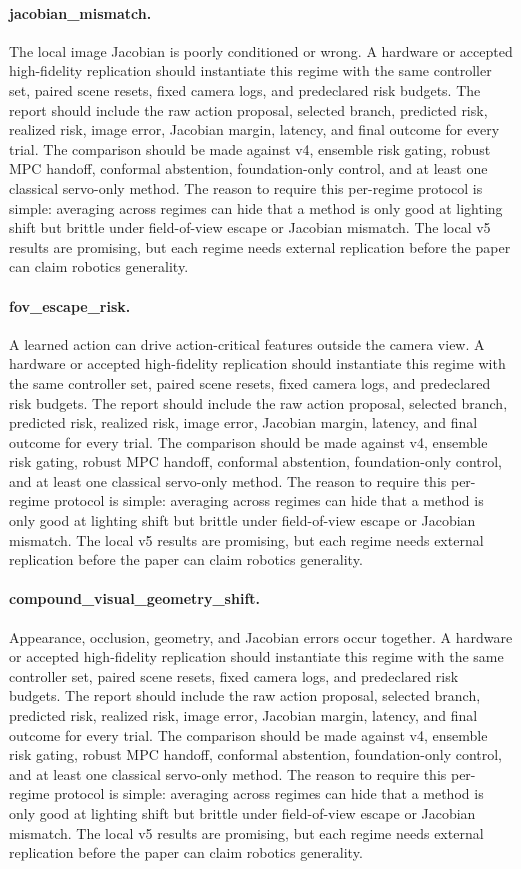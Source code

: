 \documentclass{article}
\begin{document}
\paragraph{jacobian\_mismatch.} The local image Jacobian is poorly conditioned or wrong.
A hardware or accepted high-fidelity replication should instantiate this regime with the same controller set, paired scene resets, fixed camera logs, and predeclared risk budgets. The report should include the raw action proposal, selected branch, predicted risk, realized risk, image error, Jacobian margin, latency, and final outcome for every trial. The comparison should be made against v4, ensemble risk gating, robust MPC handoff, conformal abstention, foundation-only control, and at least one classical servo-only method.
The reason to require this per-regime protocol is simple: averaging across regimes can hide that a method is only good at lighting shift but brittle under field-of-view escape or Jacobian mismatch. The local v5 results are promising, but each regime needs external replication before the paper can claim robotics generality.
\paragraph{fov\_escape\_risk.} A learned action can drive action-critical features outside the camera view.
A hardware or accepted high-fidelity replication should instantiate this regime with the same controller set, paired scene resets, fixed camera logs, and predeclared risk budgets. The report should include the raw action proposal, selected branch, predicted risk, realized risk, image error, Jacobian margin, latency, and final outcome for every trial. The comparison should be made against v4, ensemble risk gating, robust MPC handoff, conformal abstention, foundation-only control, and at least one classical servo-only method.
The reason to require this per-regime protocol is simple: averaging across regimes can hide that a method is only good at lighting shift but brittle under field-of-view escape or Jacobian mismatch. The local v5 results are promising, but each regime needs external replication before the paper can claim robotics generality.
\paragraph{compound\_visual\_geometry\_shift.} Appearance, occlusion, geometry, and Jacobian errors occur together.
A hardware or accepted high-fidelity replication should instantiate this regime with the same controller set, paired scene resets, fixed camera logs, and predeclared risk budgets. The report should include the raw action proposal, selected branch, predicted risk, realized risk, image error, Jacobian margin, latency, and final outcome for every trial. The comparison should be made against v4, ensemble risk gating, robust MPC handoff, conformal abstention, foundation-only control, and at least one classical servo-only method.
The reason to require this per-regime protocol is simple: averaging across regimes can hide that a method is only good at lighting shift but brittle under field-of-view escape or Jacobian mismatch. The local v5 results are promising, but each regime needs external replication before the paper can claim robotics generality.
\clearpage
\end{document}
